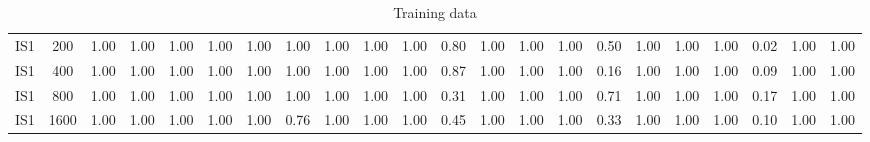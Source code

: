 \documentclass[10pt]{article}
\begin{document}
\begin{table}
\begin{tabular}{ cc||c c c c | c c c c | c c c c | c c c c| c c c c}
 					IS1 & 200 & 1.00 & 1.00 & 1.00 & 1.00 & 1.00 & 1.00 & 1.00 & 1.00& 1.00 & 0.80 & 1.00 & 1.00& 1.00 & 0.50 & 1.00 & 1.00 & 1.00 & 0.02 & 1.00 & 1.00\\ 
 					IS1 & 400 & 1.00 & 1.00 & 1.00 & 1.00 & 1.00 & 1.00 & 1.00 & 1.00& 1.00 & 0.87 & 1.00 & 1.00& 1.00 & 0.16 & 1.00 & 1.00 & 1.00 & 0.09 & 1.00 & 1.00\\ 
 					IS1 & 800 & 1.00 & 1.00 & 1.00 & 1.00 & 1.00 & 1.00 & 1.00 & 1.00& 1.00 & 0.31 & 1.00 & 1.00& 1.00 & 0.71 & 1.00 & 1.00 & 1.00 & 0.17 & 1.00 & 1.00\\ 
 					IS1 & 1600 & 1.00 & 1.00 & 1.00 & 1.00 & 1.00 & 0.76 & 1.00 & 1.00& 1.00 & 0.45 & 1.00 & 1.00& 1.00 & 0.33 & 1.00 & 1.00 & 1.00 & 0.10 & 1.00 & 1.00\\ \hline
 \hline
  \end{tabular}
  \caption{Training data}
\end{table}
\end{document}
